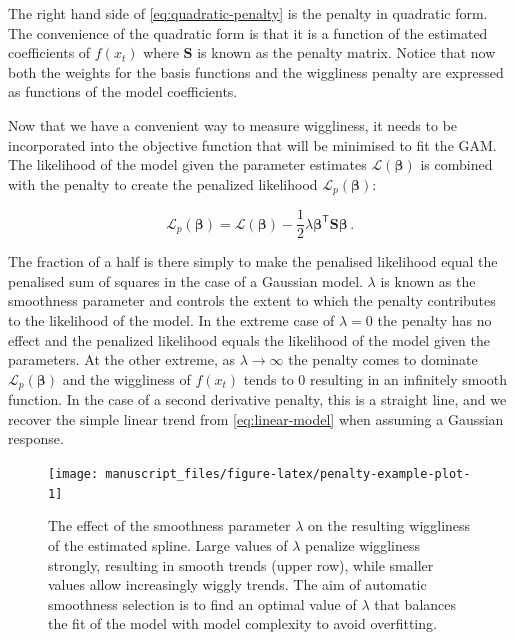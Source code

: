 \documentclass[12pt,]{article}
\begin{document}
The right hand side of \eqref{eq:quadratic-penalty} is the penalty in
quadratic form. The convenience of the quadratic form is that it is a
function of the estimated coefficients of \(f(x_t)\) where
\(\mathbf{S}\) is known as the penalty matrix. Notice that now both the
weights for the basis functions and the wiggliness penalty are expressed
as functions of the model coefficients.

Now that we have a convenient way to measure wiggliness, it needs to be
incorporated into the objective function that will be minimised to fit
the GAM. The likelihood of the model given the parameter estimates
\(\mathcal{L}(\boldsymbol{\beta})\) is combined with the penalty to
create the penalized likelihood \(\mathcal{L}_p(\boldsymbol{\beta})\):

\begin{equation*}
\mathcal{L}_p(\boldsymbol{\beta}) = \mathcal{L}(\boldsymbol{\beta}) - \frac{1}{2} \lambda\boldsymbol{\beta}^{\mathsf{T}}\mathbf{S}\boldsymbol{\beta}\, .
\end{equation*}

The fraction of a half is there simply to make the penalised likelihood
equal the penalised sum of squares in the case of a Gaussian model.
\(\lambda\) is known as the smoothness parameter and controls the extent
to which the penalty contributes to the likelihood of the model. In the
extreme case of \(\lambda = 0\) the penalty has no effect and the
penalized likelihood equals the likelihood of the model given the
parameters. At the other extreme, as \(\lambda \rightarrow \infty\) the
penalty comes to dominate \(\mathcal{L}_p(\boldsymbol{\beta})\) and the
wiggliness of \(f(x_t)\) tends to \(0\) resulting in an infinitely
smooth function. In the case of a second derivative penalty, this is a
straight line, and we recover the simple linear trend from
\eqref{eq:linear-model} when assuming a Gaussian response.

\begin{figure}

{\centering \texttt{[image: manuscript\_files/figure-latex/penalty-example-plot-1]} 

}

\caption{The effect of the smoothness parameter $\lambda$ on the resulting wiggliness of the estimated spline. Large values of $\lambda$ penalize wiggliness strongly, resulting in smooth trends (upper row), while smaller values allow increasingly wiggly trends. The aim of automatic smoothness selection is to find an optimal value of $\lambda$ that balances the fit of the model with model complexity to avoid overfitting.}\label{fig:penalty-example-plot}
\end{figure}
\end{document}
